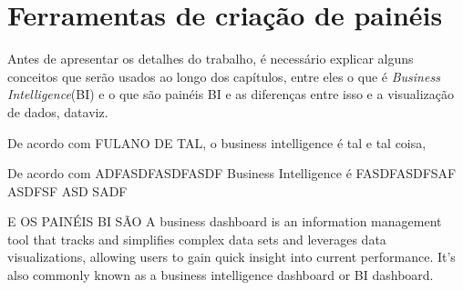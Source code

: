 \chapter{Ferramentas de criação de painéis}

Antes de apresentar os detalhes do trabalho, é necessário explicar alguns conceitos que serão usados ao longo dos capítulos, entre eles o que é \textit{Business Intelligence}(BI) e o que são painéis BI e as diferenças entre isso e a visualização de dados, dataviz.

De acordo com FULANO DE TAL, o business intelligence é tal e tal coisa, 


De acordo com ADFASDFASDFASDF Business Intelligence é FASDFASDFSAF ASDFSF ASD SADF

E OS PAINÉIS BI SÃO A business dashboard is an information management tool that tracks and simplifies complex data sets and leverages data visualizations, allowing users to gain quick insight into current performance. It's also commonly known as a business intelligence dashboard or BI dashboard.
